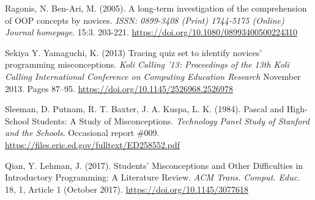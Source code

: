 \documentclass[twocolumn]{article}
\begin{document}
\begin{thebibliography}{9}
Ragonis, N. Ben-Ari, M. (2005). A long-term investigation of the comprehension of OOP concepts by novices. \emph{ISSN: 0899-3408 (Print) 1744-5175 (Online) Journal homepage}. 15:3. 203-221. 
\url{https://doi.org/10.1080/08993400500224310}


Sekiya Y. Yamaguchi, K. (2013) Tracing quiz set to identify novices' programming misconceptions. \emph{Koli Calling '13: Proceedings of the 13th Koli Calling International Conference on Computing Education Research} November 2013. Pages 87–95.
\url{https://doi.org/10.1145/2526968.2526978} 

Sleeman, D. Putnam, R. T. Baxter, J. A. Kuspa, L. K. (1984). Pascal and High-School Students: A Study of Misconceptions. \emph{Technology Panel Study of Stanford and the Schools}. Occasional report \#009. 
\url{https://files.eric.ed.gov/fulltext/ED258552.pdf}

Qian, Y. Lehman, J. (2017). Students’ Misconceptions and Other Difficulties in Introductory Programming: A Literature Review. \emph{ACM Trans. Comput. Educ.} 18, 1, Article 1 (October 2017).
\url{https://doi.org/10.1145/3077618} 



\end{thebibliography}
\printbibliography
\end{document}
